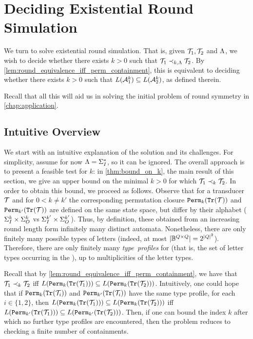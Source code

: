 \chapter{Deciding Existential Round Simulation}
\label{chap:deciding_existential_round_sim}

We turn to solve existential round simulation. That is, given $\mathcal{T}_1,\mathcal{T}_2$ and $\Lambda$, we wish to decide whether there exists $k>0$ such that $\mathcal{T}_1\prec_{k,\Lambda} \mathcal{T}_2$. 
By \autoref{lem:round_equivalence_iff_perm_containment}, this is equivalent to deciding whether there exists $k>0$ such that $L(\mathcal{A}^k_1)\subseteq L(\mathcal{A}^k_2)$, as defined therein.

Recall that all this will aid us in solving the initial problem of round symmetry in \autoref{chap:application}.

\section{Intuitive Overview}
\label{sec:intuitive_overview}
We start with an intuitive explanation of the solution and its challenges. For simplicity, assume for now $\Lambda=\Sigma_{I}^*$, so it can be ignored. The overall approach is to present a feasible test for $k$: in \autoref{thm:bound_on_k}, the main result of this section, we give an upper bound on the minimal $k>0$ for which $\mathcal{T}_1\prec_{k} \mathcal{T}_2$. In order to obtain this bound, we proceed as follows. Observe that for a transducer $\mathcal{T}$ and for $0<k\neq k'$ the corresponding permutation closure \NFAs ${\mathtt{Perm}}_k({\mathtt{Tr}}(\mathcal{T}))$ and ${\mathtt{Perm}}_{k'}({\mathtt{Tr}}(\mathcal{T}))$ are defined on the same state space, but differ by their alphabet ($\Sigma_{I}^{k}\times \Sigma_{O}^{k}$ vs $\Sigma_{I}^{k'}\times \Sigma_{O}^{k'}$). Thus, by definition, these \NFAs obtained from an increasing round length form infinitely many distinct automata. Nonetheless, there are only finitely many possible types of letters (indeed, at most $|\mathbb{B}^{Q\times Q}|=2^{|Q|^2}$). Therefore, there are only finitely many \emph{type~profiles} for \NFAs (that is, the set of letter types occurring in the \NFA), up to multiplicities of the letter types.

Recall that by \autoref{lem:round_equivalence_iff_perm_containment}, we have that $\mathcal{T}_1\prec_k \mathcal{T}_2$ iff $L({\mathtt{Perm}}_k({\mathtt{Tr}}(\mathcal{T}_1)))\subseteq L({\mathtt{Perm}}_{k}({\mathtt{Tr}}(\mathcal{T}_2)))$.
Intuitively, one could hope that if ${\mathtt{Perm}}_k({\mathtt{Tr}}(\mathcal{T}_i))$ and ${\mathtt{Perm}}_{k'}({\mathtt{Tr}}(\mathcal{T}_i))$ have the same type profile, for each $i\in \{1,2\}$, then $L({\mathtt{Perm}}_k({\mathtt{Tr}}(\mathcal{T}_1)))\subseteq L({\mathtt{Perm}}_{k}({\mathtt{Tr}}(\mathcal{T}_2)))$ iff $L({\mathtt{Perm}}_{k'}({\mathtt{Tr}}(\mathcal{T}_1)))\subseteq L({\mathtt{Perm}}_{k'}({\mathtt{Tr}}(\mathcal{T}_2)))$. Then, if one can bound the index $k$ after which no further type profiles are encountered, then the problem reduces to checking a finite number of containments.

